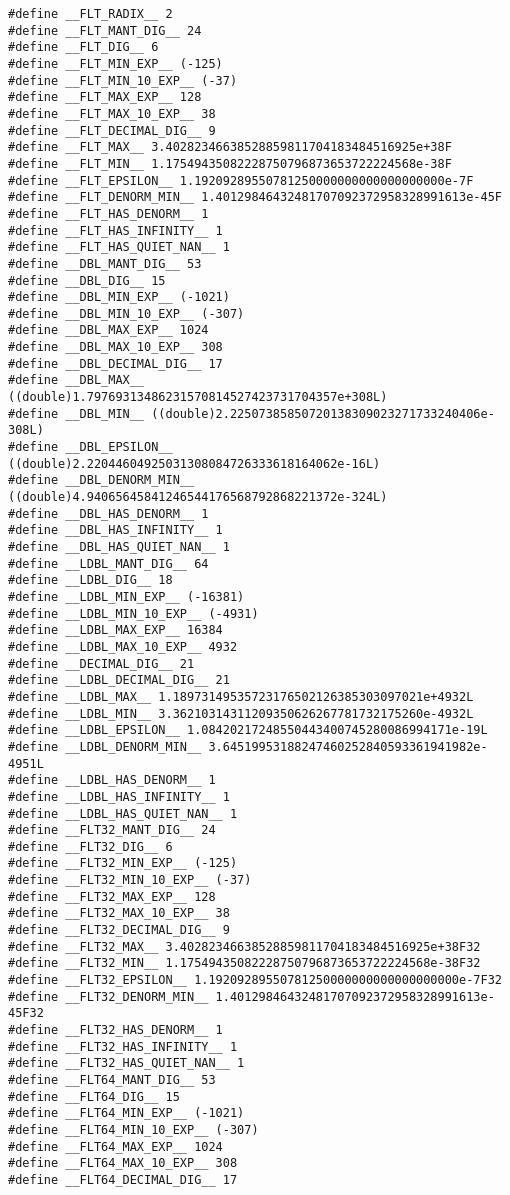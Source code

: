 \documentclass[11pt]{article}
\begin{document}
\begin{verbatim}
#define __FLT_RADIX__ 2
#define __FLT_MANT_DIG__ 24
#define __FLT_DIG__ 6
#define __FLT_MIN_EXP__ (-125)
#define __FLT_MIN_10_EXP__ (-37)
#define __FLT_MAX_EXP__ 128
#define __FLT_MAX_10_EXP__ 38
#define __FLT_DECIMAL_DIG__ 9
#define __FLT_MAX__ 3.40282346638528859811704183484516925e+38F
#define __FLT_MIN__ 1.17549435082228750796873653722224568e-38F
#define __FLT_EPSILON__ 1.19209289550781250000000000000000000e-7F
#define __FLT_DENORM_MIN__ 1.40129846432481707092372958328991613e-45F
#define __FLT_HAS_DENORM__ 1
#define __FLT_HAS_INFINITY__ 1
#define __FLT_HAS_QUIET_NAN__ 1
#define __DBL_MANT_DIG__ 53
#define __DBL_DIG__ 15
#define __DBL_MIN_EXP__ (-1021)
#define __DBL_MIN_10_EXP__ (-307)
#define __DBL_MAX_EXP__ 1024
#define __DBL_MAX_10_EXP__ 308
#define __DBL_DECIMAL_DIG__ 17
#define __DBL_MAX__ ((double)1.79769313486231570814527423731704357e+308L)
#define __DBL_MIN__ ((double)2.22507385850720138309023271733240406e-308L)
#define __DBL_EPSILON__ ((double)2.22044604925031308084726333618164062e-16L)
#define __DBL_DENORM_MIN__ ((double)4.94065645841246544176568792868221372e-324L)
#define __DBL_HAS_DENORM__ 1
#define __DBL_HAS_INFINITY__ 1
#define __DBL_HAS_QUIET_NAN__ 1
#define __LDBL_MANT_DIG__ 64
#define __LDBL_DIG__ 18
#define __LDBL_MIN_EXP__ (-16381)
#define __LDBL_MIN_10_EXP__ (-4931)
#define __LDBL_MAX_EXP__ 16384
#define __LDBL_MAX_10_EXP__ 4932
#define __DECIMAL_DIG__ 21
#define __LDBL_DECIMAL_DIG__ 21
#define __LDBL_MAX__ 1.18973149535723176502126385303097021e+4932L
#define __LDBL_MIN__ 3.36210314311209350626267781732175260e-4932L
#define __LDBL_EPSILON__ 1.08420217248550443400745280086994171e-19L
#define __LDBL_DENORM_MIN__ 3.64519953188247460252840593361941982e-4951L
#define __LDBL_HAS_DENORM__ 1
#define __LDBL_HAS_INFINITY__ 1
#define __LDBL_HAS_QUIET_NAN__ 1
#define __FLT32_MANT_DIG__ 24
#define __FLT32_DIG__ 6
#define __FLT32_MIN_EXP__ (-125)
#define __FLT32_MIN_10_EXP__ (-37)
#define __FLT32_MAX_EXP__ 128
#define __FLT32_MAX_10_EXP__ 38
#define __FLT32_DECIMAL_DIG__ 9
#define __FLT32_MAX__ 3.40282346638528859811704183484516925e+38F32
#define __FLT32_MIN__ 1.17549435082228750796873653722224568e-38F32
#define __FLT32_EPSILON__ 1.19209289550781250000000000000000000e-7F32
#define __FLT32_DENORM_MIN__ 1.40129846432481707092372958328991613e-45F32
#define __FLT32_HAS_DENORM__ 1
#define __FLT32_HAS_INFINITY__ 1
#define __FLT32_HAS_QUIET_NAN__ 1
#define __FLT64_MANT_DIG__ 53
#define __FLT64_DIG__ 15
#define __FLT64_MIN_EXP__ (-1021)
#define __FLT64_MIN_10_EXP__ (-307)
#define __FLT64_MAX_EXP__ 1024
#define __FLT64_MAX_10_EXP__ 308
#define __FLT64_DECIMAL_DIG__ 17

\end{verbatim}
\end{document}
